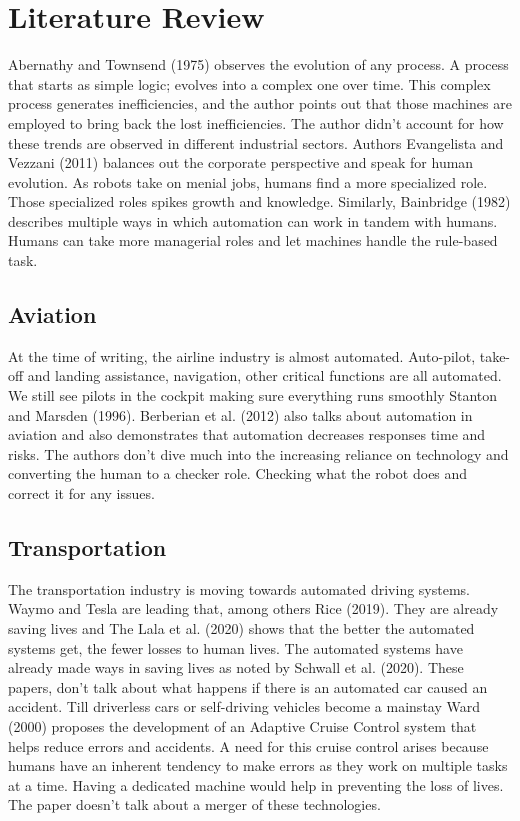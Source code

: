 \documentclass[
  english,
  man]{apa7}
\begin{document}
\hypertarget{literature-review}{%
\section{Literature Review}\label{literature-review}}

Abernathy and Townsend (1975) observes the evolution of any process. A process that starts as simple logic; evolves into a complex one over time. This complex process generates inefficiencies, and the author points out that those machines are employed to bring back the lost inefficiencies. The author didn't account for how these trends are observed in different industrial sectors. Authors Evangelista and Vezzani (2011) balances out the corporate perspective and speak for human evolution. As robots take on menial jobs, humans find a more specialized role. Those specialized roles spikes growth and knowledge. Similarly, Bainbridge (1982) describes multiple ways in which automation can work in tandem with humans. Humans can take more managerial roles and let machines handle the rule-based task.

\hypertarget{aviation}{%
\subsection{Aviation}\label{aviation}}

At the time of writing, the airline industry is almost automated. Auto-pilot, take-off and landing assistance, navigation, other critical functions are all automated. We still see pilots in the cockpit making sure everything runs smoothly Stanton and Marsden (1996). Berberian et al. (2012) also talks about automation in aviation and also demonstrates that automation decreases responses time and risks. The authors don't dive much into the increasing reliance on technology and converting the human to a checker role. Checking what the robot does and correct it for any issues.

\hypertarget{transportation}{%
\subsection{Transportation}\label{transportation}}

The transportation industry is moving towards automated driving systems. Waymo and Tesla are leading that, among others Rice (2019). They are already saving lives and The Lala et al. (2020) shows that the better the automated systems get, the fewer losses to human lives. The automated systems have already made ways in saving lives as noted by Schwall et al. (2020). These papers, don't talk about what happens if there is an automated car caused an accident. Till driverless cars or self-driving vehicles become a mainstay Ward (2000) proposes the development of an Adaptive Cruise Control system that helps reduce errors and accidents. A need for this cruise control arises because humans have an inherent tendency to make errors as they work on multiple tasks at a time. Having a dedicated machine would help in preventing the loss of lives. The paper doesn't talk about a merger of these technologies.
\end{document}
